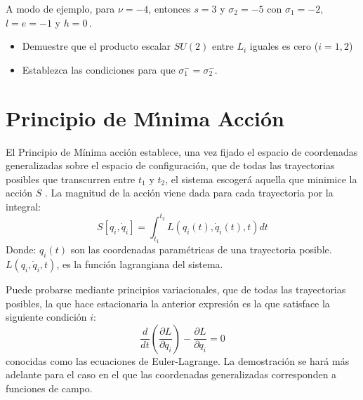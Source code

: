 \begin{frame}
A modo de ejemplo,
para $\nu=-4$, entonces $s=3$ y $\sigma_2=-5$ con $\sigma_1=-2$, $l=e=-1$ y $h=0$\,.



  \begin{itemize}
  \item Demuestre que el producto escalar $SU(2)$ entre $L_i$ iguales es cero ($i=1,2$) 
  \item   Establezca las condiciones para que $\sigma_1^-=\sigma_2^-$.
  \end{itemize}

\end{frame}



\section{Principio de M\'\i nima Acci\'on}
\label{sec:la}

El Principio de Mínima acción establece, una vez fijado el espacio de
coordenadas generalizadas sobre el espacio de configuración, que de
todas las trayectorias posibles que transcurren entre $t_1$ y $t_2$,
el sistema escoger\'a aquella que minimice la acci\'on $S$
\cite{ActionPhysics}.  La magnitud de la acci\'on viene dada para cada
trayectoria por la integral:
\begin{equation}
  \label{eq:la}
   S\left[q_i,\dot{q}_i\right] = \int_{t_{1}}^{t_{2}} L(q_i(t), \dot{q}_i(t),t) dt
\end{equation}
Donde:
$q_i(t)$ son las coordenadas param\'etricas de una trayectoria posible.
$L(q_i,\dot{q}_i,t)$, es la funci\'on lagrangiana del sistema.


Puede probarse mediante principios variacionales, que de todas las trayectorias posibles, la que hace  estacionaria la anterior expresi\'on es la que satisface la siguiente condici\'on $i$:
\begin{equation}
  \label{eq:eel}
 \frac{d}{dt} \left ( \frac{\partial L}{\partial\dot{q}_i} \right ) - \frac{\partial L}{\partial q_i} = 0
\end{equation}
conocidas como las ecuaciones de Euler-Lagrange. La demostraci\'on se
har\'a m\'as adelante para el caso en el que las coordenadas generalizadas
corresponden a funciones de campo. 

